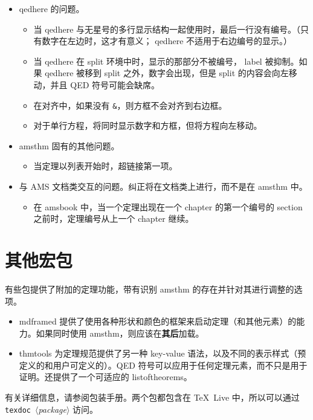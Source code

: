 \documentclass[11pt,twoside,fontset=sikou,punct=kaiming]{ctexart}
\renewcommand{\emph}[1]{\textbf{#1}}
\newcommand{\ntt}{%
  \ttfamily\mdseries\upshape%
}
\DeclareRobustCommand{\cn}[1]{{\ntt\bslchar#1}}
\DeclareRobustCommand{\cls}[1]{{\ntt#1}}
\DeclareRobustCommand{\pkg}[1]{{\ntt#1}}
\DeclareRobustCommand{\env}[1]{{\ntt#1}}
\def\<#1>{{\normalfont$\langle$\textit{#1}$\rangle$}}
\begin{document}
\begin{itemize}
\item \cn{qedhere} 的问题。 %
 \begin{itemize}
  \item 当 \cn{qedhere} 与无星号的多行显示结构一起使用时，最后一行没有编号。（只有数字在左边时，这才有意义；\cn{qedhere} 不适用于右边编号的显示。）
  \item 当 \cn{qedhere} 在 \env{split} 环境中时，显示的那部分不被编号，\cn{label} 被抑制。如果 \cn{qedhere} 被移到 \env{split} 之外，数字会出现，但是 \env{split} 的内容会向左移动，并且 QED 符号可能会缺席。
  \item 在对齐中，如果没有 \verb+&+，则方框不会对齐到右边框。
  \item 对于单行方程，将同时显示数字和方框，但将方程向左移动。
 \end{itemize}
\item \pkg{amsthm} 固有的其他问题。
 \begin{itemize}
  \item 当定理以列表开始时，超链接第一项。
 \end{itemize}
\item 与 AMS 文档类交互的问题。纠正将在文档类上进行，而不是在 \pkg{amsthm} 中。
 \begin{itemize}
  \item 在 \cls{amsbook} 中，当一个定理出现在一个 chapter 的第一个编号的 section 之前时，定理编号从上一个 chapter 继续。
 \end{itemize}
\end{itemize}


\section{其他宏包}

有些包提供了附加的定理功能，带有识别 \pkg{amsthm} 的存在并针对其进行调整的选项。
\begin{itemize}
\itemsep=.5\itemsep
\item \pkg{mdframed} \cite{MDF} 提供了使用各种形状和颜色的框架来启动定理（和其他元素）的能力。如果同时使用 \pkg{amsthm}，则应该在\emph{其后}加载。
\item \pkg{thmtools} \cite{THT} 为定理规范提供了另一种 key-value 语法，以及不同的表示样式（预定义的和用户可定义的）。QED 符号可以应用于任何定理元素，而不只是用于证明。还提供了一个可适应的 \cn{listoftheorems}。
\end{itemize}
有关详细信息，请参阅包装手册。两个包都包含在 \TeX~Live 中，所以可以通过 \texttt{texdoc}~\<package> 访问。
\end{document}
